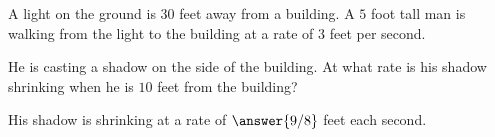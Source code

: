 \documentclass{ximera}
\author{Steven Gubkin}
\begin{document}
\begin{exercise}


	A light on the ground is $30$ feet away from a building.  A $5$ foot tall man is walking from the light to the building at a rate of $3$ feet per second.

	He is casting a shadow on the side of the building.  At what rate is his shadow shrinking when he is $10$ feet from the building?

\begin{prompt}
	His shadow is shrinking at a rate of $ \answer{9/8}$ feet each second.
\end{prompt}

\end{exercise}
\end{document}
